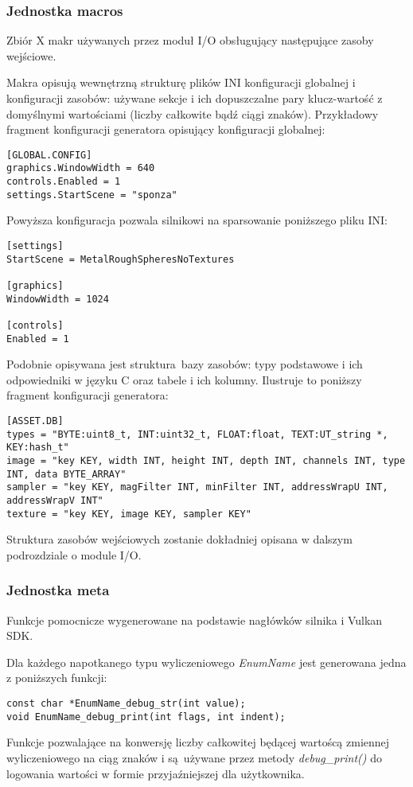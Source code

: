\subsubsection{Jednostka macros}
Zbiór X makr używanych przez moduł I/O obsługujący następujące zasoby wejściowe.

Makra opisują wewnętrzną strukturę plików INI konfiguracji globalnej i konfiguracji zasobów: używane sekcje i ich dopuszczalne pary klucz-wartość z domyślnymi wartościami (liczby całkowite bądź ciągi znaków).
Przykładowy fragment konfiguracji generatora opisujący konfiguracji globalnej:
\begin{verbatim}
[GLOBAL.CONFIG]
graphics.WindowWidth = 640
controls.Enabled = 1
settings.StartScene = "sponza"
\end{verbatim}
Powyższa konfiguracja pozwala silnikowi na sparsowanie poniższego pliku INI:
\begin{verbatim}
[settings]
StartScene = MetalRoughSpheresNoTextures

[graphics]
WindowWidth = 1024

[controls]
Enabled = 1 
\end{verbatim}

Podobnie opisywana jest struktura bazy zasobów: typy podstawowe i ich odpowiedniki w języku C oraz tabele i ich kolumny. Ilustruje to poniższy fragment konfiguracji generatora:
\begin{verbatim}
[ASSET.DB]
types = "BYTE:uint8_t, INT:uint32_t, FLOAT:float, TEXT:UT_string *, KEY:hash_t"
image = "key KEY, width INT, height INT, depth INT, channels INT, type INT, data BYTE_ARRAY"
sampler = "key KEY, magFilter INT, minFilter INT, addressWrapU INT, addressWrapV INT"
texture = "key KEY, image KEY, sampler KEY"
\end{verbatim}

Struktura zasobów wejściowych zostanie dokładniej opisana w dalszym podrozdziale o module I/O.

\subsubsection{Jednostka meta}
Funkcje pomocnicze wygenerowane na podstawie nagłówków silnika i Vulkan SDK.

Dla każdego napotkanego typu wyliczeniowego \textit{EnumName} jest generowana jedna z poniższych funkcji:
\lstset{language=C}
\begin{lstlisting}
const char *EnumName_debug_str(int value);
void EnumName_debug_print(int flags, int indent);
\end{lstlisting}
Funkcje pozwalające na konwersję liczby całkowitej będącej wartoścą zmiennej wyliczeniowego na ciąg znaków i są używane przez metody \textit{debug\_print()} do logowania wartości w formie przyjaźniejszej dla użytkownika.


